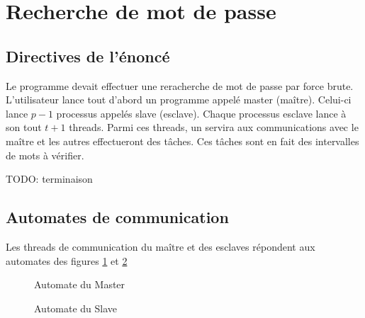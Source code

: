 \section{Recherche de mot de passe} %
\label{sec:recherche_de_mot_de_passe}

\subsection{Directives de l'énoncé} %
\label{sub:enonce}

Le programme devait effectuer une reracherche de mot de passe par force brute. L'utilisateur lance tout d'abord un programme appelé master (maître). Celui-ci lance $p-1$ processus appelés slave (esclave). Chaque processus esclave lance à son tout $t+1$ threads. Parmi ces threads, un servira aux communications avec le maître et les autres effectueront des tâches. Ces tâches sont en fait des intervalles de mots à vérifier. 



TODO: terminaison

\subsection{Automates de communication} %
\label{sub:automates_de_communication}

Les threads de communication du maître et des esclaves répondent aux automates des figures \ref{fig:master} et \ref{fig:slave}

\begin{figure}[h!]
\centering
\caption{Automate du Master}
\label{fig:master}
\end{figure}


\begin{figure}[h!]
\centering
\caption{Automate du Slave}
\label{fig:slave}
\end{figure}
